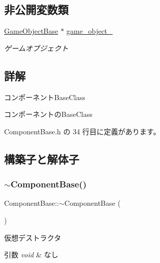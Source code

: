\subsection*{非公開変数類}
\begin{DoxyCompactItemize}
\item 
\mbox{\hyperlink{class_game_object_base}{Game\+Object\+Base}} $\ast$ \mbox{\hyperlink{class_component_base_a60a43b42437cd5be2b05d2f4f4dd8147}{game\+\_\+object\+\_\+}}
\begin{DoxyCompactList}\small\item\em ゲームオブジェクト \end{DoxyCompactList}\end{DoxyCompactItemize}


\subsection{詳解}
コンポーネント\+Base\+Class 

コンポーネントの\+Base\+Class 

 Component\+Base.\+h の 34 行目に定義があります。



\subsection{構築子と解体子}
\mbox{\label{class_component_base_a80a37e33ecca2471b2186fba1aaf2cdd}} 
\subsubsection{\texorpdfstring{$\sim$\+Component\+Base()}{~ComponentBase()}}
{\footnotesize\ttfamily Component\+Base\+::$\sim$\+Component\+Base (\begin{DoxyParamCaption}{ }\end{DoxyParamCaption})\hspace{0.3cm}{\ttfamily [pure virtual]}}



仮想デストラクタ 


\begin{DoxyParams}{引数}
{\em void} & なし \\
\hline
\end{DoxyParams}



